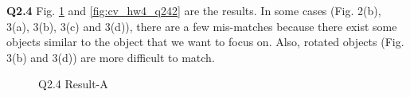 \documentclass[
  course = {{16-720B Computer Vision}},
  quartile = {{1}},
  assignment = 4\ -\ Feature\ Descriptors\ \&\ Homographies\ \& \  RANSAC,
  name = {{Kangle Deng}},
  email = {{kangled@andrew.cmu.edu}},
  firstexercise = 1
]{aga-homework}
\begin{document}
\noindent \textbf{Q2.4} Fig. \ref{fig:cv_hw4_q241} and \ref{fig:cv_hw4_q242} are the results. In some cases (Fig. 2(b), 3(a), 3(b), 3(c) and 3(d)), there are a few mis-matches because there exist some objects similar to the object that we want to focus on. Also, rotated objects (Fig. 3(b) and 3(d)) are more difficult to match.

\begin{figure}
    \centering
    \caption{Q2.4 Result-A}
    \label{fig:cv_hw4_q241}
\end{figure}
\end{document}
